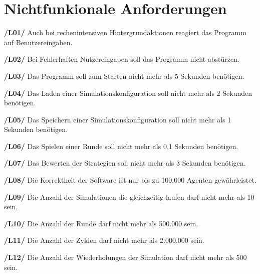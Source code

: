 \section{Nichtfunkionale Anforderungen}

\textbf{/L01/ }
Auch bei rechenintensiven Hintergrundaktionen reagiert das Programm auf Benutzereingaben.

\textbf{/L02/}
Bei Fehlerhaften Nutzereingaben soll das Programm nicht abstürzen.

\textbf{/L03/}
Das Programm soll zum Starten nicht mehr als 5 Sekunden benötigen.

\textbf{/L04/}
Das Laden einer Simulationskonfiguration soll nicht mehr als 2 Sekunden benötigen.

\textbf{/L05/}
Das Speichern einer Simulationskonfiguration soll nicht mehr als 1 Sekunden benötigen.

\textbf{/L06/}
Das Spielen einer Runde soll nicht mehr als 0,1 Sekunden benötigen.

\textbf{/L07/}
Das Bewerten der Strategien soll nicht mehr als 3 Sekunden benötigen.

\textbf{/L08/}
Die Korrektheit der Software ist nur bis zu 100.000 Agenten gewährleistet.

\textbf{/L09/}
Die Anzahl der Simulationen die gleichzeitig laufen darf nicht mehr als 10 sein.

\textbf{/L10/}
Die Anzahl der Runde darf nicht mehr als 500.000 sein.

\textbf{/L11/}
Die Anzahl der Zyklen darf nicht mehr als 2.000.000 sein.

\textbf{/L12/}
Die Anzahl der Wiederholungen der Simulation darf nicht mehr als 500 sein.